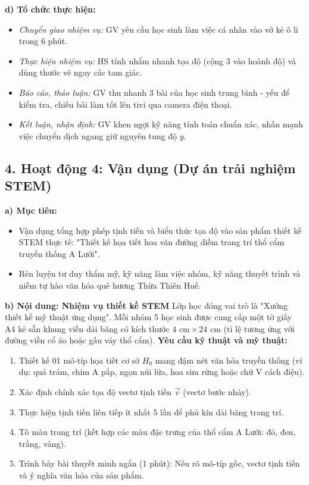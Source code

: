 \documentclass[12pt, a4paper]{article}
\renewcommand{\vec}[1]{\overrightarrow{#1}}
\begin{document}
\noindent \textbf{d) Tổ chức thực hiện:}  
\begin{itemize}[leftmargin=0.8cm]  
    \item \textit{Chuyển giao nhiệm vụ:} GV yêu cầu học sinh làm việc cá nhân vào vở kẻ ô li trong 6 phút.  
    \item \textit{Thực hiện nhiệm vụ:} HS tính nhẩm nhanh tọa độ (cộng 3 vào hoành độ) và dùng thước vẽ ngay các tam giác.  
    \item \textit{Báo cáo, thảo luận:} GV thu nhanh 3 bài của học sinh trung bình - yếu để kiểm tra, chiếu bài làm tốt lên tivi qua camera điện thoại.  
    \item \textit{Kết luận, nhận định:} GV khen ngợi kỹ năng tính toán chuẩn xác, nhấn mạnh việc chuyển dịch ngang giữ nguyên tung độ $y$.  
\end{itemize}  
  
\subsection*{4. Hoạt động 4: Vận dụng (Dự án trải nghiệm STEM)}  
  
\noindent \textbf{a) Mục tiêu:}  
\begin{itemize}[leftmargin=0.8cm]  
    \item Vận dụng tổng hợp phép tịnh tiến và biểu thức tọa độ vào sản phẩm thiết kế STEM thực tế: "Thiết kế họa tiết hoa văn đường diềm trang trí thổ cẩm truyền thống A Lưới".  
    \item Rèn luyện tư duy thẩm mỹ, kỹ năng làm việc nhóm, kỹ năng thuyết trình và niềm tự hào văn hóa quê hương Thừa Thiên Huế.  
\end{itemize}  
  
\noindent \textbf{b) Nội dung: Nhiệm vụ thiết kế STEM}  
Lớp học đóng vai trò là "Xưởng thiết kế mỹ thuật ứng dụng". Mỗi nhóm 5 học sinh được cung cấp một tờ giấy A4 kẻ sẵn khung viền dải băng có kích thước $4\text{ cm} \times 24\text{ cm}$ (tỉ lệ tương ứng với đường viền cổ áo hoặc gấu váy thổ cẩm).  
\textbf{Yêu cầu kỹ thuật và mỹ thuật:}  
\begin{enumerate}[leftmargin=0.6cm]  
    \item Thiết kế 01 mô-típ họa tiết cơ sở $H_0$ mang đậm nét văn hóa truyền thống (ví dụ: quả trám, chim A pắp, ngọn núi lửa, hoa sim rừng hoặc chữ V cách điệu).  
    \item Xác định chính xác tọa độ vectơ tịnh tiến $\vec{v}$ (vectơ bước nhảy).  
    \item Thực hiện tịnh tiến liên tiếp ít nhất 5 lần để phủ kín dải băng trang trí.  
    \item Tô màu trang trí (kết hợp các màu đặc trưng của thổ cẩm A Lưới: đỏ, đen, trắng, vàng).  
    \item Trình bày bài thuyết minh ngắn (1 phút): Nêu rõ mô-típ gốc, vectơ tịnh tiến và ý nghĩa văn hóa của sản phẩm.  
\end{enumerate}  
  
\end{document}
